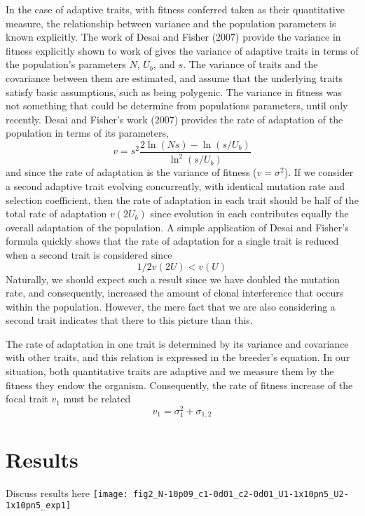 \documentclass[11pt,one column]{article}
\begin{document}
\begin{multicols}{2}
In the case of adaptive traits, with fitness conferred taken as their quantitative measure, the relationship between variance and the population parameters is known explicitly. The work of Desai and Fisher (2007) provide the variance in fitness explicitly shown to work of gives the variance of adaptive traits in terms of the population’s parameters $N$, $U_b$, and $s$. The variance of traits and the covariance between them are estimated, and assume that the underlying traits satisfy basic assumptions, such as being polygenic. The variance in fitness was not something that could be determine from populations parameters, until only recently. Desai and Fisher’s work (2007) provides the rate of adaptation of the population in terms of its parameters,
\begin{equation} 
v =s^2  \frac{2 \ln(Ns)-\ln(s/U_b)}{\ln^2(s/U_b)}
\end{equation}  
and since the rate of adaptation is the variance of fitness ($v=\sigma^2$).  If we consider a second adaptive trait evolving concurrently, with identical mutation rate and selection coefficient, then the rate of adaptation in each trait should be half of the total rate of adaptation $v(2U_b)$ since evolution in each contributes equally the overall adaptation of the population. A simple application of Desai and Fisher’s formula quickly shows that the rate of adaptation for a single trait is reduced when a second trait is considered since
\[ 1/2  v(2U)<v(U) \]
Naturally, we should expect such a result since we have doubled the mutation rate, and consequently, increased the amount of clonal interference that occurs within the population. However, the mere fact that we are also considering a second trait indicates that there to this picture than this.\par

The rate of adaptation in one trait is determined by its variance and covariance with other traits, and this relation is expressed in the breeder’s equation. In our situation, both quantitative traits are adaptive and we measure them by the fitness they endow the organism. Consequently, the rate of fitness increase of the focal trait $v_1$ must be related
\begin{equation}
v_1=\sigma_1^2+\sigma_{1,2}
\end{equation}

\section*{Results}
Discuss results here
{\centering
\texttt{[image: fig2\_N-10p09\_c1-0d01\_c2-0d01\_U1-1x10pn5\_U2-1x10pn5\_exp1]}
 \label{fig.1}}


\end{multicols}
\end{document}
